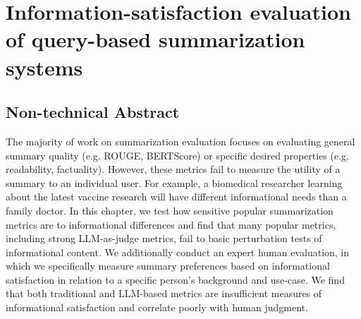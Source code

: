 \chapter{Information-satisfaction evaluation of query-based summarization systems} \label{chap:chap-7}


\section*{Non-technical Abstract}
The majority of work on summarization evaluation focuses on evaluating general summary quality (e.g. ROUGE, BERTScore) or specific desired properties (e.g. readability, factuality). However, these metrics fail to measure the utility of a summary to an individual user. For example, a biomedical researcher learning about the latest vaccine research will have different informational needs than a family doctor. In this chapter, we test how sensitive popular summarization metrics are to informational differences and find that many popular metrics, including strong LLM-as-judge metrics, fail to basic perturbation tests of informational content. We additionally conduct an expert human evaluation, in which we specifically measure summary preferences based on informational satisfaction in relation to a specific person's background and use-case. We find that both traditional and LLM-based metrics are insufficient measures of informational satisfaction and correlate poorly with human judgment.











